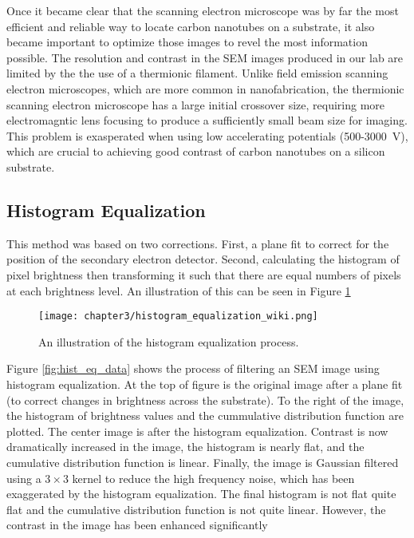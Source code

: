 Once it became clear that the scanning electron microscope was by far the most efficient and reliable way to locate carbon nanotubes on a substrate, it also became important to optimize those images to revel the most information possible. The resolution and contrast in the SEM images produced in our lab are limited by the the use of a thermionic  filament. Unlike field emission scanning electron microscopes, which are more common in nanofabrication, the thermionic scanning electron microscope has a large initial crossover size, requiring more electromagntic lens focusing to produce a sufficiently small beam size for imaging. This problem is exasperated when using low accelerating potentials (500-\SI{3000}{\volt}), which are crucial to achieving good contrast of carbon nanotubes on a silicon substrate.

\subsection{Histogram Equalization}

This method was based on two corrections. First, a plane fit to correct for the position of the secondary electron detector. Second, calculating the histogram of pixel brightness then transforming it such that there are equal numbers of pixels at each brightness level. An illustration of this can be seen in Figure \ref{fig:hist_eq}

\begin{figure}
	\centering
	\texttt{[image: chapter3/histogram\_equalization\_wiki.png]}
	\caption{An illustration of the histogram equalization process.}
	\label{fig:hist_eq}
\end{figure}

Figure \ref{fig:hist_eq_data} shows the process of filtering an SEM image using histogram equalization. At the top of figure is the original image after a plane fit (to correct changes in brightness across the substrate). To the right of the image, the histogram of brightness values and the cummulative distribution function are plotted. The center image is after the histogram equalization. Contrast is now dramatically increased in the image, the histogram is nearly flat, and the cumulative distribution function is linear. Finally, the image is Gaussian filtered using a $3 \times 3$ kernel to reduce the high frequency noise, which has been exaggerated by the histogram equalization. The final histogram is not flat quite flat and the cumulative distribution function is not quite linear. However, the contrast in the image has been enhanced significantly


